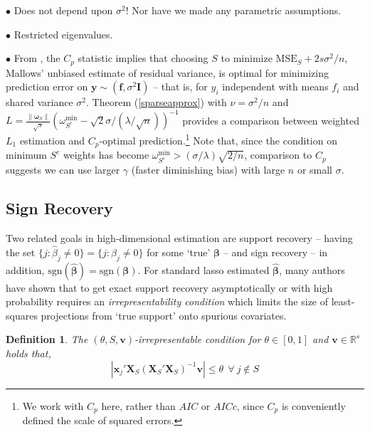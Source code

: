 \documentclass[12pt]{article}
\newtheorem{definition}{\sc Definition}[section]
\newcommand{\bs}[1]{\boldsymbol{#1}}
\newcommand{\mr}[1]{\mathrm{#1}}
\newcommand{\bm}[1]{\mathbf{#1}}
\newcommand{\ds}[1]{\mathds{#1}}
\begin{document}

\noindent $\bullet$   Does not depend upon $\sigma^2$!  Nor have we made any parametric assumptions.

\noindent $\bullet$  Restricted eigenvalues.

\noindent $\bullet$ From \cite{efron_estimation_2004}, the $C_p$ statistic
\citep{mallows_comments_1973} implies that choosing $S$ to minimize
$\mr{MSE}_S + 2s\sigma^2/n$, Mallows' unbiased estimate of residual variance,
is optimal for minimizing prediction error on $\bm{y} \sim
(\bm{f},\sigma^2\bm{I})$ -- that is, for $y_i$ independent with means $f_i$
and shared variance $\sigma^2$. Theorem (\ref{sparseapprox}) with $\nu = \sigma^2/n$ and $L = \frac{\|\bs{\omega}_S\|}{\sqrt{s}}\left(\omega^{\mr{min}}_{S^c}- \sqrt{2}\sigma/(\lambda/\sqrt{n})\right)^{-1}$ provides a comparison between weighted $L_1$ estimation and $C_p$-optimal prediction.\footnote{We work with
$C_p$ here, rather than $AIC$ or $AICc$, since $C_p$ is conveniently defined
the scale of squared errors.} Note that, since the condition on minimum $S^c$ weights has become
$\omega^{\mr{min}}_{S^c} > (\sigma/\lambda)\sqrt{2/n}$, comparison to $C_p$ suggests we can use larger $\gamma$ (faster diminishing bias) with large $n$ or small $\sigma$.

\subsection{Sign Recovery}

Two related goals in high-dimensional estimation are  support recovery -- having the set $\{j: \hat\beta_j \neq 0\} = \{j: \beta_j \neq 0\}$ for some `true' $\bs{\beta}$ -- and  sign recovery -- in addition, $\mr{sgn}(\bs{\hat\beta}) = \mr{sgn}(\bs{\beta})$.  For standard lasso estimated $\bs{\hat\beta}$, many authors have shown \citep[e.g.,][]{buhlmann_statistics_2011,zou_adaptive_2006} that to get exact support recovery asymptotically or with high probability requires an {\it irrepresentability condition} which limits the size of least-squares projections from `true support' onto spurious covariates.  
\begin{definition} 
The $(\theta,S,\bm{v})$-irrepresentable condition for $\theta\in[0,1]$ and $\bm{v}\in \ds{R}^s$ holds that, 
\begin{equation}\label{irrep}
|\bs{x}_j'\bm{X}_S(\bm{X}_S'\bm{X}_S)^{-1}\bm{v}| \leq \theta ~~\forall~j\notin S
\end{equation}
\end{definition}
\end{document}
